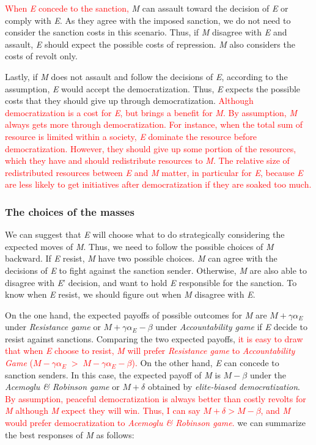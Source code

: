 \documentclass[11pt, letterpage]{article}
\begin{document}
\textcolor{red}{When \textit{E} concede to the sanction,} \textit{M} can assault toward the decision of \textit{E} or comply with \textit{E}. As they agree with the imposed sanction, we do not need to consider the sanction costs in this scenario. Thus, if \textit{M} disagree with \textit{E} and assault, \textit{E} should expect the possible costs of repression. \textit{M} also considers the costs of revolt only. 
	
Lastly, if \textit{M} does not assault and follow the decisions of \textit{E}, according to the assumption, \textit{E} would accept the democratization. Thus, \textit{E} expects the possible costs that they should give up through democratization. \textcolor{red}{Although democratization is a cost for \textit{E}, but brings a benefit for \textit{M}. By assumption, \textit{M} always gets more through democratization. For instance, when the total sum of resource is limited within a society, \textit{E} dominate the resource before democratization. However, they should give up some portion of the resources, which they have and should redistribute resources to \textit{M}. The relative size of redistributed resources between \textit{E} and \textit{M} matter, in particular for \textit{E}, because \textit{E} are less likely to get initiatives after democratization if they are soaked too much.}
	
\subsubsection*{The choices of the masses}

We can suggest that \textit{E} will choose what to do strategically considering the expected moves of \textit{M}. Thus, we need to follow the possible choices of \textit{M} backward. If \textit{E} resist, \textit{M} have two possible choices. \textit{M} can agree with the decisions of \textit{E} to fight against the sanction sender. Otherwise,  \textit{M} are also able to disagree with \textit{E}' decision, and want to hold \textit{E} responsible for the sanction. To know when \textit{E} resist, we should figure out when \textit{M} disagree with \textit{E}.
	
On the one hand, the expected payoffs of possible outcomes for \textit{M} are $M+\gamma\alpha_{E}$ under \textit{Resistance game} or $M+\gamma\alpha_{E}-\beta$ under \textit{Accountability game} if \textit{E} decide to resist against sanctions. Comparing the two expected payoffs, \textcolor{red}{it is easy to draw that when \textit{E} choose to resist, \textit{M} will prefer \textit{Resistance game} to \textit{Accountability Game} ($M-\gamma\alpha_{E}\;>\;M-\gamma\alpha_{E}-\beta$).} On the other hand, \textit{E} can concede to sanction senders. In this case, the expected payoff of \textit{M} is $M-\beta$ under the \textit{Acemoglu \& Robinson game} or $M+\delta$ obtained by \textit{elite-biased democratization}. \textcolor{red}{By assumption, peaceful democratization is always better than costly revolts for \textit{M} although \textit{M} expect they will win. Thus, I can say $M+\delta > M-\beta$, and \textit{M} would prefer democratization to \textit{Acemoglu \& Robinson game}.} we can summarize the best responses of \textit{M} as follows:
\end{document}
